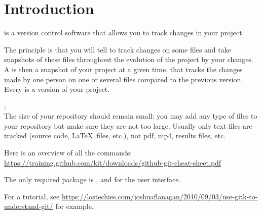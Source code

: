 \chapter{Introduction}

 is a version control software that allows you to track changes in your project.

The principle is that you will tell  to track changes on some files and take snapshots of these files throughout the evolution of the project by  your changes.
A  is then a snapshot of your project at a given time, that tracks the changes made by one person on one or several files compared to the previous version.
Every  is a version of your project.

:\\
The size of your  repository should remain small: you may add any type of files to your repository but make sure they are not too large.
Usually only text files are tracked (source code, \LaTeX~files, etc.), not pdf, mp4, results files, etc.

Here is an overview of all the  commands:\\
\url{https://training.github.com/kit/downloads/github-git-cheat-sheet.pdf}

The only required package is , and  for the user interface.

For a tutorial, see \url{https://lostechies.com/joshuaflanagan/2010/09/03/use-gitk-to-understand-git/} for example.
